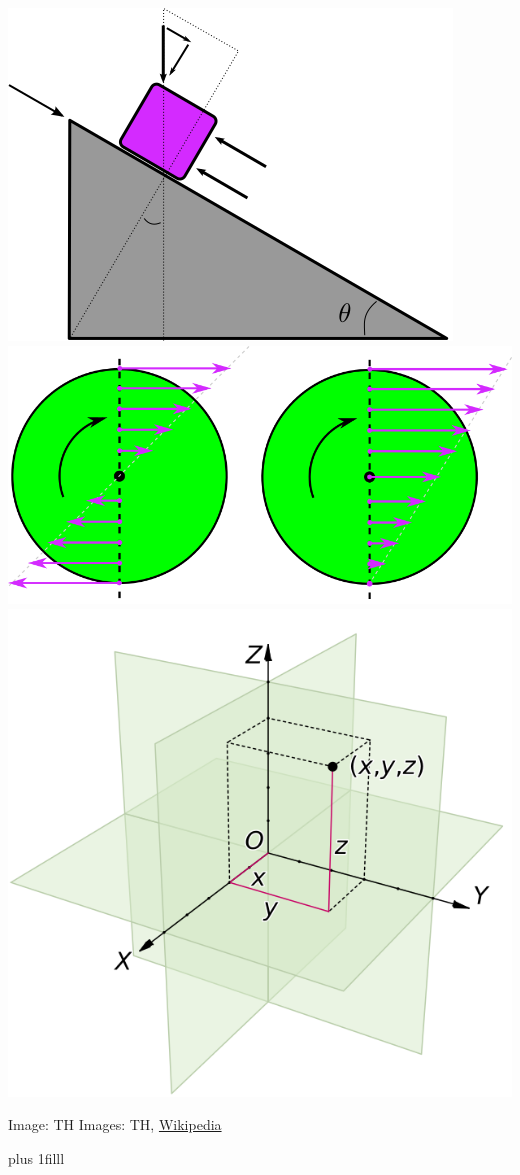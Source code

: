 \documentclass[fleqn]{beamer} %
\newcommand{\btVFill}{\vskip0pt plus 1filll}
\begin{document}
\begin{frame}
\begin{multicols}{2}
				\includegraphics[scale=0.209]{images/sliding_block.png}
				 \includegraphics[scale=0.125]{images/pure_roll_no_slip.png} 
				 \includegraphics[scale=0.17]{images/cartesian_3d.png}
				\end{multicols}
				{\tiny Image: TH\hspace{60mm} Images: TH, \href{https://en.wikipedia.org/wiki/Cartesian_coordinate_system}{Wikipedia} }

				\btVFill
			\end{frame}
\end{document}
